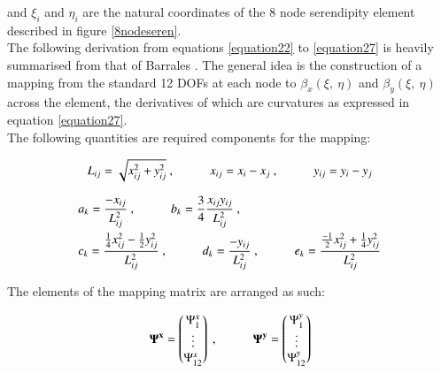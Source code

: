 and $\xi_i$ and $\eta_i$ are the natural coordinates of the 8 node serendipity element described in figure \ref{8nodeseren}.\\

The following derivation from equations \eqref{equation22} to \eqref{equation27} is heavily summarised from that of Barrales \cite{Bar12}. The general idea is the construction of a mapping from the standard 12 DOFs at each node to $\beta_x (\xi,\ \eta)$ and $\beta_y (\xi,\ \eta)$ across the element, the derivatives of which are curvatures as expressed in equation \eqref{equation27}.\\

The following quantities are required components for the mapping:

\begin{equation} 
L_{ij} = \sqrt{x_{ij}^2 + y_{ij}^2}\ ,
\hspace{10mm}
x_{ij} = x_i - x_j\ ,
\hspace{10mm}
y_{ij} = y_i - y_j
\label{equation22}
\end{equation}


\begin{gather} 
	\begin{aligned}
		&a_k = \frac{-x_{ij}}{L_{ij}^2}\ ,
		\hspace{10mm}
		b_k = \frac{3}{4} \frac{x_{ij} y_{ij}}{L_{ij}^2}\ , \\
		&c_k = \frac{\frac{1}{4} x_{ij}^2 - \frac{1}{2} y_{ij}^2}{L_{ij}^2}\ ,
		\hspace{10mm}
		d_k = \frac{-y_{ij}}{L_{ij}^2}\ ,
		\hspace{10mm}
		e_k = \frac{\frac{-1}{2} x_{ij}^2 + \frac{1}{4} y_{ij}^2}{L_{ij}^2}
		\label{equation23}
	\end{aligned}
\end{gather}

The elements of the mapping matrix are arranged as such:

\begin{equation} 
\mathbf{\Psi^x} = 
\begin{pmatrix}
\Psi_1^x \\
\vdots \\
\Psi_{12}^x
\end{pmatrix}\ ,
\hspace{10mm}
\mathbf{\Psi^y} = 
\begin{pmatrix}
\Psi_1^y \\
\vdots \\
\Psi_{12}^y
\end{pmatrix}
\label{equation24}
\end{equation}

